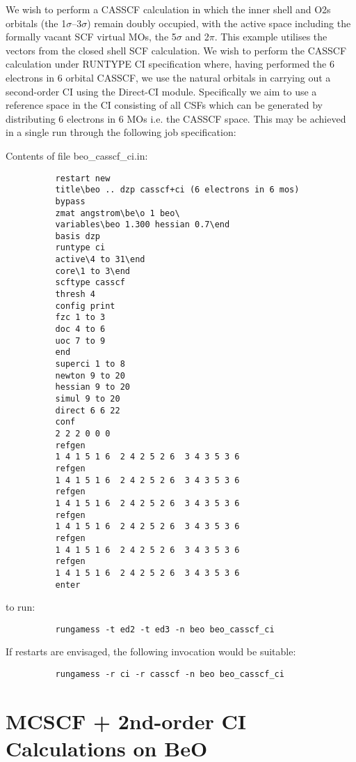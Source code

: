 \documentclass[11pt,fleqn]{article}
\begin{document}
We wish to perform a CASSCF calculation in which the inner shell and
O2s orbitals (the 1$\sigma$--3$\sigma$) remain doubly occupied, with
the active space including the formally vacant SCF virtual MOs,
the 5$\sigma$ and 2$\pi$. This example utilises the vectors from the
closed shell SCF calculation.  We wish to perform the CASSCF calculation
under RUNTYPE CI specification where, having performed the 6 electrons
in 6 orbital CASSCF, we use the natural orbitals in carrying out a
second-order CI using the Direct-CI module. Specifically we aim to use a
reference space in the CI consisting of all CSFs which can be generated
by distributing 6 electrons in 6 MOs i.e. the CASSCF  space.  This may
be achieved in a single run through the following job specification:

Contents of file beo\_casscf\_ci.in:
{
\footnotesize
\begin{verbatim}
          restart new
          title\beo .. dzp casscf+ci (6 electrons in 6 mos)
          bypass
          zmat angstrom\be\o 1 beo\
          variables\beo 1.300 hessian 0.7\end
          basis dzp
          runtype ci
          active\4 to 31\end
          core\1 to 3\end
          scftype casscf
          thresh 4
          config print
          fzc 1 to 3
          doc 4 to 6
          uoc 7 to 9
          end
          superci 1 to 8
          newton 9 to 20
          hessian 9 to 20
          simul 9 to 20
          direct 6 6 22
          conf 
          2 2 2 0 0 0
          refgen
          1 4 1 5 1 6  2 4 2 5 2 6  3 4 3 5 3 6
          refgen
          1 4 1 5 1 6  2 4 2 5 2 6  3 4 3 5 3 6
          refgen
          1 4 1 5 1 6  2 4 2 5 2 6  3 4 3 5 3 6
          refgen
          1 4 1 5 1 6  2 4 2 5 2 6  3 4 3 5 3 6
          refgen
          1 4 1 5 1 6  2 4 2 5 2 6  3 4 3 5 3 6
          refgen
          1 4 1 5 1 6  2 4 2 5 2 6  3 4 3 5 3 6
          enter
\end{verbatim}
}
to run:
{
\footnotesize
\begin{verbatim}
          rungamess -t ed2 -t ed3 -n beo beo_casscf_ci
\end{verbatim}
}
If restarts are envisaged, the following invocation would be 
suitable:
{
\footnotesize
\begin{verbatim}
          rungamess -r ci -r casscf -n beo beo_casscf_ci
\end{verbatim}
}

\section[MCSCF + 2nd-order CI Calculations on BeO]{MCSCF + 2nd-order CI Calculations on BeO}
\end{document}

